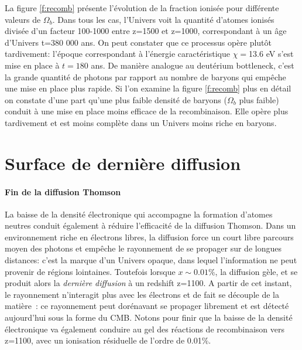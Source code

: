 La figure \ref{f:recomb} présente l'évolution de la fraction ionisée pour différente valeurs de $\Omega_b$. Dans tous les cas, l'Univers voit la quantité d'atomes ionisés divisée d'un facteur 100-1000 entre z=1500 et z=1000, correspondant à un âge d'Univers t=380 000 ans. On peut constater que ce processus opère plutôt tardivement: l'époque correspondant à l'énergie caractéristique $\chi=$13.6 eV s'est mise en place à $t=180$ ans. De manière analogue au deutérium bottleneck, c'est la grande quantité de photons par rapport au nombre de baryons  qui empêche une mise en place plus rapide. Si l'on examine la figure \ref{f:recomb} plus en détail on constate d'une part qu'une plus faible densité de baryons ($\Omega_b$ plus faible) conduit à une mise en place moins efficace de la recombinaison. Elle opère plus tardivement et est moins complète dans un Univers moins riche en baryons.

\section{Surface de dernière diffusion}

\paragraph{Fin de la diffusion Thomson} La baisse de la densité électronique qui accompagne la formation d'atomes neutres conduit également à réduire l'efficacité de la diffusion Thomson. Dans un environnement riche en électrons libres, la diffusion force un court libre parcours moyen des photons et empêche le rayonnement de se propager sur de longues distances: c'est la marque d'un Univers opaque, dans lequel l'information ne peut provenir de régions lointaines.  Toutefois lorsque $x\sim 0.01\%$, la diffusion gèle, et se produit alors la \textit{dernière diffusion} à un redshift z=1100. A partir de cet instant, le rayonnement n'interagit plus avec les électrons et de fait se découple de la matière~: ce rayonnement peut dorénavant se propager librement et est détecté aujourd'hui sous la forme du CMB. Notons pour finir que la baisse de la densité électronique va également conduire au gel des réactions de recombinaison vers z=1100, avec un ionisation résiduelle de l'ordre de 0.01\%.



